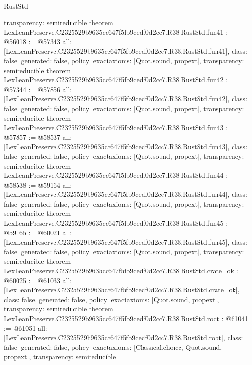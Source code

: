 \begin{lexlean}{RustStd}
\begin{coremodule}
{  transparency: semireducible
}
theorem LexLeanPreserve.C2325529b9635cc647f5fb9cedf0d2cc7.R38.RustStd.fun41 : @56018 := @57343 {
  all: [LexLeanPreserve.C2325529b9635cc647f5fb9cedf0d2cc7.R38.RustStd.fun41],
  class: false,
  generated: false,
  policy: exact{axioms: [Quot.sound, propext]},
  transparency: semireducible
}
theorem LexLeanPreserve.C2325529b9635cc647f5fb9cedf0d2cc7.R38.RustStd.fun42 : @57344 := @57856 {
  all: [LexLeanPreserve.C2325529b9635cc647f5fb9cedf0d2cc7.R38.RustStd.fun42],
  class: false,
  generated: false,
  policy: exact{axioms: [Quot.sound, propext]},
  transparency: semireducible
}
theorem LexLeanPreserve.C2325529b9635cc647f5fb9cedf0d2cc7.R38.RustStd.fun43 : @57857 := @58537 {
  all: [LexLeanPreserve.C2325529b9635cc647f5fb9cedf0d2cc7.R38.RustStd.fun43],
  class: false,
  generated: false,
  policy: exact{axioms: [Quot.sound, propext]},
  transparency: semireducible
}
theorem LexLeanPreserve.C2325529b9635cc647f5fb9cedf0d2cc7.R38.RustStd.fun44 : @58538 := @59164 {
  all: [LexLeanPreserve.C2325529b9635cc647f5fb9cedf0d2cc7.R38.RustStd.fun44],
  class: false,
  generated: false,
  policy: exact{axioms: [Quot.sound, propext]},
  transparency: semireducible
}
theorem LexLeanPreserve.C2325529b9635cc647f5fb9cedf0d2cc7.R38.RustStd.fun45 : @59165 := @60021 {
  all: [LexLeanPreserve.C2325529b9635cc647f5fb9cedf0d2cc7.R38.RustStd.fun45],
  class: false,
  generated: false,
  policy: exact{axioms: [Quot.sound, propext]},
  transparency: semireducible
}
theorem LexLeanPreserve.C2325529b9635cc647f5fb9cedf0d2cc7.R38.RustStd.crate_ok : @60025 := @61033 {
  all: [LexLeanPreserve.C2325529b9635cc647f5fb9cedf0d2cc7.R38.RustStd.crate_ok],
  class: false,
  generated: false,
  policy: exact{axioms: [Quot.sound, propext]},
  transparency: semireducible
}
theorem LexLeanPreserve.C2325529b9635cc647f5fb9cedf0d2cc7.R38.RustStd.root : @61041 := @61051 {
  all: [LexLeanPreserve.C2325529b9635cc647f5fb9cedf0d2cc7.R38.RustStd.root],
  class: false,
  generated: false,
  policy: exact{axioms: [Classical.choice, Quot.sound, propext]},
  transparency: semireducible
}


\end{coremodule}
\end{lexlean}
